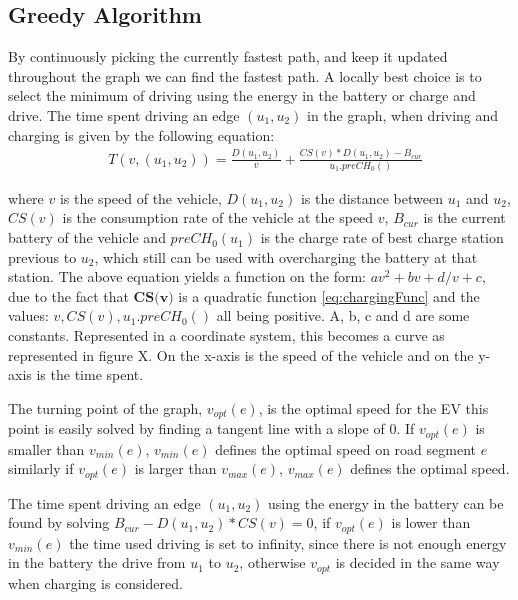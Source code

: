 \subsection{Greedy Algorithm}
By continuously picking the currently fastest path, and keep it updated throughout the graph we can find the fastest path. A locally best choice is to select the minimum of driving using the energy in the battery or charge and drive.
The time spent driving an edge $(u_1, u_2)$ in the graph, when driving and charging is given by the following equation:
\begin{equation}
\begin{aligned}
 & T(v,(u_1, u_2)) = \frac{D(u_1, u_2)}{v} + \frac{CS(v) * D(u_1, u_2) - B_{cur}}{u_1.preCH_0()}
\end{aligned}
\end{equation}\label{eq:drivingAndCharging}


\begin{tikzpicture}
\end{tikzpicture}


where $v$ is the speed of the vehicle, $D(u_1, u_2)$ is the distance between $u_1$ and $u_2$,
$CS(v)$ is the consumption rate of the vehicle at the speed $v$, $B_{cur}$ is the current battery of the vehicle and $preCH_0(u_1)$ is the charge rate of best charge station previous to $u_2$, which still can be used with overcharging the battery at that station. The above equation yields a function on the form: $av^2 + bv + d/v + c$, due to the fact that $\textbf{CS(v)}$ is a quadratic function \ref{eq:chargingFunc} and the values: $v, CS(v), u_1.preCH_0()$ all being positive.
A, b, c and d are some constants. Represented in a coordinate system, this becomes a curve as represented in figure X. On the x-axis is the speed of the vehicle and on the y-axis is the time spent.

The turning point of the graph, $v_{opt}(e)$, is the optimal speed for the EV this point is easily solved by finding a tangent line with a slope of 0. If $v_{opt}(e)$ is smaller than $v_{min}(e)$, $v_{min}(e)$ defines the optimal speed on road segment $e$ similarly if $v_{opt}(e)$ is larger than $v_{max}(e)$, $v_{max}(e)$ defines the optimal speed.  

The time spent driving an edge $(u_1, u_2)$ using the energy in the battery can be found by solving $B_{cur} - D(u_1, u_2) * CS(v) = 0$, if $v_{opt}(e)$ is lower than $v_{min}(e)$ the time used driving is set to infinity, since there is not enough energy in the battery the drive from $u_1$ to $u_2$, otherwise $v_{opt}$ is decided in the same way when charging is considered.   


